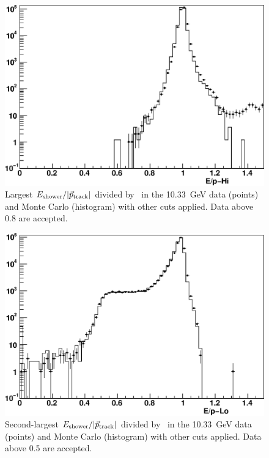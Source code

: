 \documentclass{cornell}
\begin{document}
\begin{figure}[p]
  \begin{center}
    \includegraphics[width=0.7\linewidth]{eeagreementf}
  \end{center}
  \caption[Largest $E_\subs{shower}/|\vec{p}_\subs{track}|$ in Bhabha events]{\label{eeagreemente} Largest
  $E_\subs{shower}/|\vec{p}_\subs{track}|$ divided by \ebeam\ in the
  10.33~GeV data (points) and Monte Carlo (histogram) with other cuts
  applied.  Data above 0.8 are accepted.}
\end{figure}

\begin{figure}[p]
  \begin{center}
    \includegraphics[width=0.7\linewidth]{eeagreementg}
  \end{center}
  \caption[Second-largest $E_\subs{shower}/|\vec{p}_\subs{track}|$ in Bhabha events]{\label{eeagreementf} Second-largest
  $E_\subs{shower}/|\vec{p}_\subs{track}|$ divided by \ebeam\ in the
  10.33~GeV data (points) and Monte Carlo (histogram) with other cuts
  applied.  Data above 0.5 are accepted.}
\end{figure}
\end{document}
